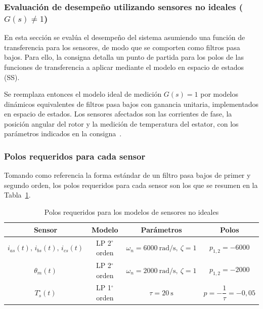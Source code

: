 \documentclass[12pt, a4paper,journal, onecolumn, compsoc]{IEEEtran}
\begin{document}
\subsubsection{Evaluación de desempeño utilizando sensores no ideales ($G(s)\neq 1$)}
En esta sección se evalúa el desempeño del sistema asumiendo una función de transferencia para los sensores, de modo que se comporten como filtros pasa bajos. Para ello, la consigna detalla un punto de partida para los polos de las funciones de transferencia a aplicar mediante el modelo en espacio de estados (SS).

Se reemplaza entonces el modelo ideal de medición $G(s)=1$ por modelos dinámicos equivalentes de filtros pasa bajos con ganancia unitaria, implementados en espacio de estados. Los sensores afectados son las corrientes de fase, la posición angular del rotor y la medición de temperatura del estator, con los parámetros indicados en la consigna~\cite{guia_trabajo}.

\subsubsection*{Polos requeridos para cada sensor}

Tomando como referencia la forma estándar de un filtro pasa bajos de primer y segundo orden, los polos requeridos para cada sensor son los que se resumen en la Tabla~\ref{tab:polos_sensores}.

\begin{table}[H]
    \centering
    \caption{Polos requeridos para los modelos de sensores no ideales}
    \label{tab:polos_sensores}
    \begin{tabular}{|c|c|c|c|}
        \hline
        \textbf{Sensor} & \textbf{Modelo} & \textbf{Parámetros} & \textbf{Polos} \\
        \hline
        $i_{as}(t),\,i_{bs}(t),\,i_{cs}(t)$ 
        & LP 2$^\circ$ orden 
        & $\omega_n=6000\ \text{rad/s},\ \zeta=1$ 
        & $p_{1,2}=-6000$ \\
        \hline
        $\theta_m(t)$ 
        & LP 2$^\circ$ orden 
        & $\omega_n=2000\ \text{rad/s},\ \zeta=1$ 
        & $p_{1,2}=-2000$ \\
        \hline
        $T_s^\circ(t)$ 
        & LP 1$^\circ$ orden 
        & $\tau=20\ \text{s}$ 
        & $p=-\dfrac{1}{\tau}=-0{,}05$ \\
        \hline
    \end{tabular}
\end{table}
\end{document}
